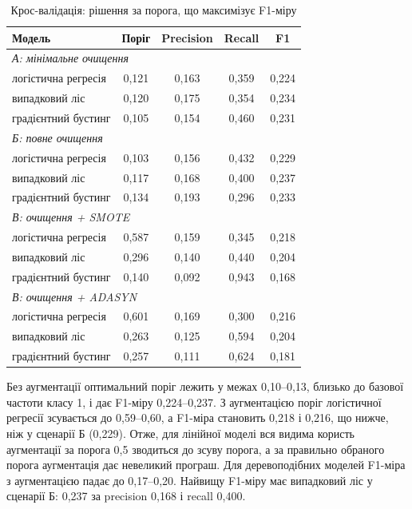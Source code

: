 \documentclass[14pt,a4paper]{extreport}
\begin{document}
\begin{table}[H]
\caption{Крос-валідація: рішення за порога, що максимізує F1-міру}
\label{tab:cv_tuned}
\small
\renewcommand{\arraystretch}{1.15}
\begin{tabularx}{\linewidth}{|X|c|c|c|c|}
\hline
\textbf{Модель} & \textbf{Поріг} & \textbf{Precision} & \textbf{Recall} & \textbf{F1} \\
\hline
\multicolumn{5}{|l|}{\textit{А: мінімальне очищення}} \\
\hline
логістична регресія & 0,121 & 0,163 & 0,359 & 0,224 \\
\hline
випадковий ліс & 0,120 & 0,175 & 0,354 & 0,234 \\
\hline
градієнтний бустинг & 0,105 & 0,154 & 0,460 & 0,231 \\
\hline
\multicolumn{5}{|l|}{\textit{Б: повне очищення}} \\
\hline
логістична регресія & 0,103 & 0,156 & 0,432 & 0,229 \\
\hline
випадковий ліс & 0,117 & 0,168 & 0,400 & 0,237 \\
\hline
градієнтний бустинг & 0,134 & 0,193 & 0,296 & 0,233 \\
\hline
\multicolumn{5}{|l|}{\textit{В: очищення + SMOTE}} \\
\hline
логістична регресія & 0,587 & 0,159 & 0,345 & 0,218 \\
\hline
випадковий ліс & 0,296 & 0,140 & 0,440 & 0,204 \\
\hline
градієнтний бустинг & 0,140 & 0,092 & 0,943 & 0,168 \\
\hline
\multicolumn{5}{|l|}{\textit{В: очищення + ADASYN}} \\
\hline
логістична регресія & 0,601 & 0,169 & 0,300 & 0,216 \\
\hline
випадковий ліс & 0,263 & 0,125 & 0,594 & 0,204 \\
\hline
градієнтний бустинг & 0,257 & 0,111 & 0,624 & 0,181 \\
\hline
\end{tabularx}
\end{table}

Без аугментації оптимальний поріг лежить у межах 0,10--0,13, близько до базової частоти класу 1, і дає F1-міру 0,224--0,237. З аугментацією поріг логістичної регресії зсувається до 0,59--0,60, а F1-міра становить 0,218 і 0,216, що нижче, ніж у сценарії Б (0,229). Отже, для лінійної моделі вся видима користь аугментації за порога 0,5 зводиться до зсуву порога, а за правильно обраного порога аугментація дає невеликий програш. Для деревоподібних моделей F1-міра з аугментацією падає до 0,17--0,20. Найвищу F1-міру має випадковий ліс у сценарії Б: 0,237 за precision 0,168 і recall 0,400.
\end{document}
